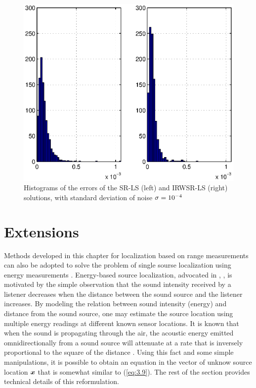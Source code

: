 \newpage

\begin{figure}[h]
\centering
\includegraphics[width=1\textwidth,height=0.42\textheight]{figures/range_dif_IRWLS/Noise04LeftBeckRightRD}%
\caption{Histograms of the errors of the SR-LS (left) and IRWSR-LS (right) solutions, with standard deviation of noise  $\protect\sigma = 10^{-4}$}
\label{fig:Noise04IRDW}
\end{figure}


\section{Extensions}


Methods developed in this chapter for localization based on range measurements can also be adopted to solve the problem of single sourse localization using energy measurements \cite{StLi}. 
Energy-based source localization, advocated in \cite{LiHu}, \cite{Saric}, is motivated by the simple observation that the sound intensity received by a listener decreases when the distance between the sound source and the listener increases. By modeling the relation between sound intensity (energy) and distance from the sound source, one may estimate the source location using multiple energy readings at different known sensor locations. It is known that when the sound is propagating through the air, the acoustic energy emitted omnidirectionally from a sound source will attenuate at a rate that is inversely proportional to the square of the distance \cite{LiHu}. Using this fact and some simple manipulations, it is possible to obtain an equation in the vector of unknow source location $\mbox{\boldmath$x$}$ that is somewhat similar to (\ref{eq:3.9}). The rest of the section provides technical details of this reformulation. 

